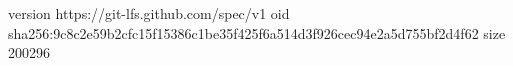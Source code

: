 version https://git-lfs.github.com/spec/v1
oid sha256:9c8c2e59b2cfc15f15386c1be35f425f6a514d3f926cec94e2a5d755bf2d4f62
size 200296
